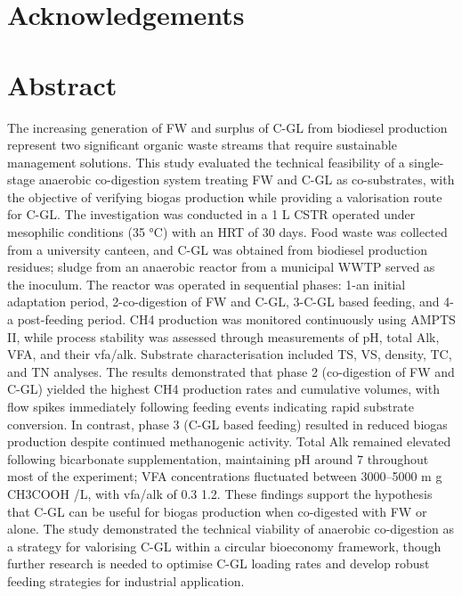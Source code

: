 \documentclass[12pt, a4paper, oneside]{report}
\begin{document}
\cleardoublepage

\cleardoublepage

\glstocfalse
\printunsrtglossary[type=abbreviations, title={List of Abbreviations}]
\glstoctrue

\glsresetall

\clearpage{}\chapter*{Acknowledgements}

\clearpage{}
\clearpage{}\chapter*{Abstract}

The increasing generation of FW and surplus of C-GL from biodiesel production represent two significant organic waste streams that require sustainable management solutions. This study evaluated the technical feasibility of a single-stage anaerobic co-digestion system treating FW and C-GL as co-substrates, with the objective of verifying biogas production while providing a valorisation route for C-GL. The investigation was conducted in a 1 L CSTR operated under mesophilic conditions (35 °C) with an HRT of 30 days. Food waste was collected from a university canteen, and C-GL was obtained from biodiesel production residues; sludge from an anaerobic reactor from a municipal WWTP served as the inoculum. The reactor was operated in sequential phases: 1-an initial adaptation period, 2-co-digestion of FW and C-GL, 3-C-GL based feeding, and 4-a post-feeding period. CH4 production was monitored continuously using AMPTS II, while process stability was assessed through measurements of pH, total Alk, VFA, and their vfa/alk. Substrate characterisation included TS, VS, density, TC, and TN analyses. The results demonstrated that phase 2 (co-digestion of FW and C-GL) yielded the highest CH4 production rates and cumulative volumes, with flow spikes immediately following feeding events indicating rapid substrate conversion. In contrast, phase 3 (C-GL based feeding) resulted in reduced biogas production despite continued methanogenic activity. Total Alk remained elevated following bicarbonate supplementation, maintaining pH around 7 throughout most of the experiment; VFA concentrations fluctuated between 3000–5000 m g CH3COOH /L, with vfa/alk of 0.3 1.2. These findings support the hypothesis that C-GL can be useful for biogas production when co-digested with FW or alone. The study demonstrated the technical viability of anaerobic co-digestion as a strategy for valorising C-GL within a circular bioeconomy framework, though further research is needed to optimise C-GL loading rates and develop robust feeding strategies for industrial application.
\end{document}
